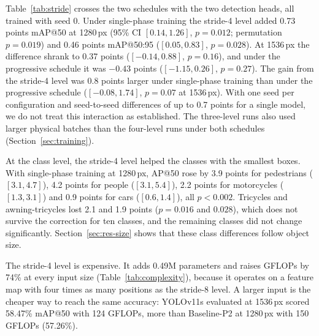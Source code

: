 \documentclass[preprint,12pt]{elsarticle}
\begin{document}
Table~\ref{tab:stride} crosses the two schedules with the two detection heads, all
trained with seed 0. Under single-phase training the stride-4 level added 0.73
points mAP@50 at 1280\,px (95\% CI $[0.14, 1.26]$, $p=0.012$; permutation
$p=0.019$) and 0.46 points mAP@50:95 ($[0.05, 0.83]$, $p=0.028$). At 1536\,px the
difference shrank to 0.37 points ($[-0.14, 0.88]$, $p=0.16$), and under the
progressive schedule it was $-0.43$ points ($[-1.15, 0.26]$, $p=0.27$). The gain
from the stride-4 level was 0.8 points larger under single-phase training than
under the progressive schedule ($[-0.08, 1.74]$, $p=0.07$ at 1536\,px). With one
seed per configuration and seed-to-seed differences of up to 0.7 points for a
single model, we do not treat this interaction as established. The three-level
runs also used larger physical batches than the four-level runs under both
schedules (Section~\ref{sec:training}).

At the class level, the stride-4 level helped the classes with the smallest boxes.
With single-phase training at 1280\,px, AP@50 rose by 3.9 points for pedestrians
($[3.1, 4.7]$), 4.2 points for people ($[3.1, 5.4]$), 2.2 points for motorcycles
($[1.3, 3.1]$) and 0.9 points for cars ($[0.6, 1.4]$), all $p<0.002$. Tricycles
and awning-tricycles lost 2.1 and 1.9 points ($p=0.016$ and $0.028$), which does
not survive the correction for ten classes, and the remaining classes did not
change significantly. Section~\ref{sec:res-size} shows that these class
differences follow object size.

The stride-4 level is expensive. It adds 0.49M parameters and raises GFLOPs by
74\% at every input size (Table~\ref{tab:complexity}), because it operates on a
feature map with four times as many positions as the stride-8 level. A larger
input is the cheaper way to reach the same accuracy: YOLOv11s evaluated at 1536\,px
scored 58.47\% mAP@50 with 124 GFLOPs, more than Baseline-P2 at 1280\,px with 150
GFLOPs (57.26\%).
\end{document}
